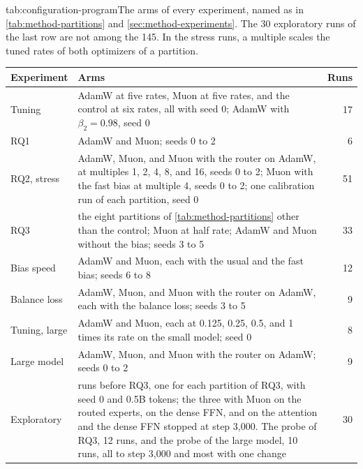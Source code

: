 \begin{table}[The arms of every experiment]{tab:configuration-program}{The arms of every experiment, named as in \cref{tab:method-partitions} and \cref{sec:method-experiments}. The 30 exploratory runs of the last row are not among the 145. In the stress runs, a multiple scales the tuned rates of both optimizers of a partition.}
  \small
  \begin{tabular}{l>{\raggedright\arraybackslash}p{11.6cm}r}
    \toprule
    Experiment    & Arms                                                                                                                                                                                       & Runs \\
    \midrule
    Tuning        & AdamW at five rates, Muon at five rates, and the control at six rates, all with seed 0; AdamW with $\beta_2 = 0.98$, seed 0                                                               & 17   \\
    RQ1           & AdamW and Muon; seeds 0 to 2                                                                                                                                                               & 6    \\
    RQ2, stress   & AdamW, Muon, and Muon with the router on AdamW, at multiples 1, 2, 4, 8, and 16, seeds 0 to 2; Muon with the fast bias at multiple 4, seeds 0 to 2; one calibration run of each partition, seed 0 & 51 \\
    RQ3           & the eight partitions of \cref{tab:method-partitions} other than the control; Muon at half rate; AdamW and Muon without the bias; seeds 3 to 5                                                 & 33   \\
    Bias speed    & AdamW and Muon, each with the usual and the fast bias; seeds 6 to 8                                                                                                                       & 12   \\
    Balance loss  & AdamW, Muon, and Muon with the router on AdamW, each with the balance loss; seeds 3 to 5                                                                                                    & 9    \\
    Tuning, large & AdamW and Muon, each at 0.125, 0.25, 0.5, and 1 times its rate on the small model; seed 0                                                                                               & 8    \\
    Large model   & AdamW, Muon, and Muon with the router on AdamW; seeds 0 to 2                                                                                                                              & 9    \\
    \midrule
    Exploratory   & 8 runs before RQ3, one for each partition of RQ3, with seed 0 and 0.5B tokens; the three with Muon on the routed experts, on the dense FFN, and on the attention and the dense FFN stopped at step 3,000. The probe of RQ3, 12 runs, and the probe of the large model, 10 runs, all to step 3,000 and most with one change & 30 \\
    \bottomrule
  \end{tabular}
\end{table}
